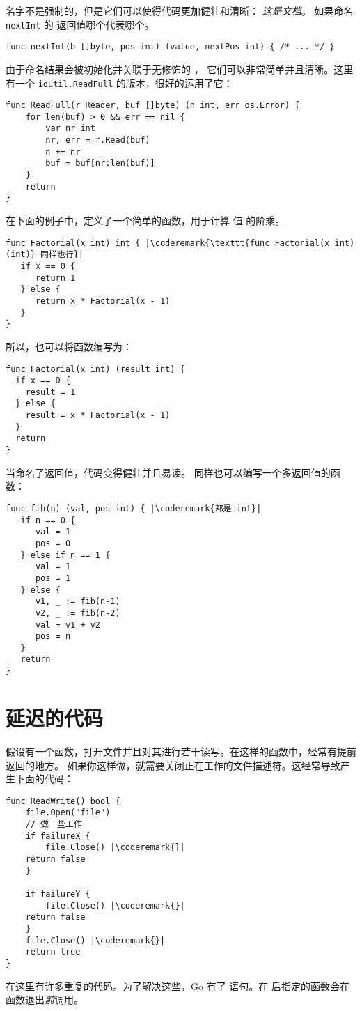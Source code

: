 名字不是强制的，但是它们可以使得代码更加健壮和清晰：
\emph{这是文档}。
如果命名 \lstinline{nextInt} 的  返回值哪个代表哪个。

\begin{lstlisting}
func nextInt(b []byte, pos int) (value, nextPos int) { /* ... */ }
\end{lstlisting}
由于命名结果会被初始化并关联于无修饰的 ，
它们可以非常简单并且清晰。这里有一个 \lstinline{ioutil.ReadFull} 的版本，很好的运用了它：

\begin{lstlisting}
func ReadFull(r Reader, buf []byte) (n int, err os.Error) {
    for len(buf) > 0 && err == nil {
        var nr int
        nr, err = r.Read(buf)
        n += nr
        buf = buf[nr:len(buf)]
    }
    return
}
\end{lstlisting}
在下面的例子中，定义了一个简单的函数，用于计算
值  的阶乘。
\begin{lstlisting}
func Factorial(x int) int { |\coderemark{\texttt{func Factorial(x int) (int)} 同样也行}|
   if x == 0 {
      return 1
   } else {
      return x * Factorial(x - 1)
   }
}
\end{lstlisting}
所以，也可以将函数编写为：
\begin{lstlisting}
func Factorial(x int) (result int) {
  if x == 0 {
    result = 1	
  } else {
    result = x * Factorial(x - 1)
  }
  return
}
\end{lstlisting}
当命名了返回值，代码变得健壮并且易读。
同样也可以编写一个多返回值的函数：
\begin{lstlisting}
func fib(n) (val, pos int) { |\coderemark{都是 int}|
   if n == 0 {
      val = 1
      pos = 0
   } else if n == 1 {
      val = 1
      pos = 1
   } else {
      v1, _ := fib(n-1)
      v2, _ := fib(n-2)
      val = v1 + v2
      pos = n
   }
   return
}
\end{lstlisting}

\section{延迟的代码}
\label{sec:deferred code}
假设有一个函数，打开文件并且对其进行若干读写。在这样的函数中，经常有提前返回的地方。
如果你这样做，就需要关闭正在工作的文件描述符。这经常导致产生下面的代码：
\begin{lstlisting}[caption=没有 defer]
func ReadWrite() bool {
    file.Open("file")
    // 做一些工作
    if failureX {
        file.Close() |\coderemark{}|
	return false
    }

    if failureY {
        file.Close() |\coderemark{}|
	return false
    }
    file.Close() |\coderemark{}|
    return true
}
\end{lstlisting}
在这里有许多重复的代码。为了解决这些，Go 有了
 语句。在 
后指定的函数会在函数退出\emph{前}调用。

